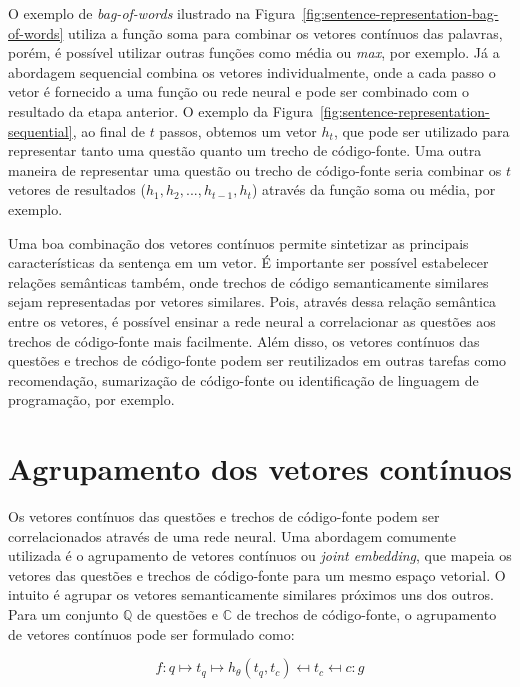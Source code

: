 O exemplo de \textit{bag-of-words} ilustrado na Figura~\ref{fig:sentence-representation-bag-of-words} utiliza a função soma para combinar os vetores contínuos das palavras, porém, é possível utilizar outras funções como média ou \emph{max}, por exemplo. Já a abordagem sequencial combina os vetores individualmente, onde a cada passo o vetor é fornecido a uma função ou rede neural e pode ser combinado com o resultado da etapa anterior. O exemplo da Figura~\ref{fig:sentence-representation-sequential}, ao final de $t$ passos, obtemos um vetor $h_{t}$, que pode ser utilizado para representar tanto uma questão quanto um trecho de código-fonte. Uma outra maneira de representar uma questão ou trecho de código-fonte seria combinar os $t$ vetores de resultados ($h_{1}, h_{2}, ..., h_{t-1}, h_{t}$) através da função soma ou média, por exemplo. 

Uma boa combinação dos vetores contínuos permite sintetizar as principais características da sentença em um vetor. É importante ser possível estabelecer relações semânticas também, onde trechos de código semanticamente similares sejam representadas por vetores similares. Pois, através dessa relação semântica entre os vetores, é possível ensinar a rede neural a correlacionar as questões aos trechos de código-fonte mais facilmente. Além disso, os vetores contínuos das questões e trechos de código-fonte podem ser reutilizados em outras tarefas como recomendação, sumarização de código-fonte ou identificação de linguagem de programação, por exemplo.

\section{Agrupamento dos vetores contínuos}

Os vetores contínuos das questões e trechos de código-fonte podem ser correlacionados através de uma rede neural. Uma abordagem comumente utilizada é o agrupamento de vetores contínuos ou \textit{joint embedding}, que mapeia os vetores das questões e trechos de código-fonte para um mesmo espaço vetorial. O intuito é agrupar os vetores semanticamente similares próximos uns dos outros. Para um conjunto $\mathbb{Q}$ de questões e $\mathbb{C}$ de trechos de código-fonte, o agrupamento de vetores contínuos pode ser formulado como:

\begin{equation}
        f: q \mapsto t_{q} \mapsto h_{\theta}(t_{q}, t_{c}) \mapsfrom t_{c} \mapsfrom c :g
\end{equation}

